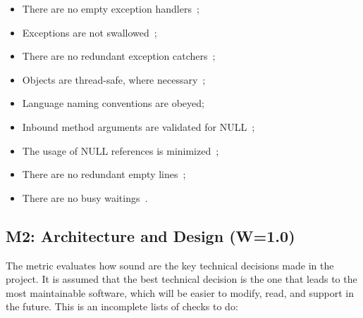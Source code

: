 \documentclass[12pt,oneside]{article}
\begin{document}
\begin{itemize}
\item There are no empty exception handlers~\citep[pp.205--208]{eo1};
\item Exceptions are not swallowed~\citep[pp.212]{eo1};
\item There are no redundant exception catchers~\citep[pp.202]{eo1};
\item Objects are thread-safe, where necessary~\citep[pp.89-93]{eo1};
\item Language naming conventions are obeyed;
\item Inbound method arguments are validated for NULL~\citep[pp.146-153]{eo1};
\item The usage of NULL references is minimized~\citep[pp.87--89]{eo1};
\item There are no redundant empty lines~\citep{yb-empty-lines};
\item There are no busy waitings~\citep{so-busywait}.
\end{itemize}

\subsection{M2: Architecture and Design (W=1.0)}

The metric evaluates how sound are the key technical decisions made
in the project. It is assumed that the best technical decision is the
one that leads to the most maintainable software, which will be easier
to modify, read, and support in the future. This is an incomplete lists of
checks to do:
\end{document}

